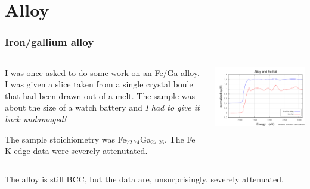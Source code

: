 \documentclass[10pt, xcolor=x11names, compress, handout]{beamer}
\begin{document}
\section{Alloy}
\begin{frame}
  \frametitle{Iron/gallium alloy}
  \begin{columns}
    \begin{column}{0.5\linewidth}
      I was once asked to do some work on an Fe/Ga alloy.  I was given
      a slice taken from a single crystal boule that had been drawn
      out of a melt.  The sample was about the size of a watch battery
      and \textit{I had to give it back undamaged!}

      \medskip

      The sample stoichiometry was Fe$_{72.74}$Ga$_{27.26}$.  The Fe K
      edge data were severely attenutated.
    \end{column}
    \begin{column}{0.5\linewidth}
      \includegraphics[width=\linewidth]{images/alloy_foil.png}
    \end{column}
  \end{columns}

  \bigskip

  The alloy is still BCC, but the data are, unsurprisingly, severely
  attenuated.
\end{frame}
\end{document}
